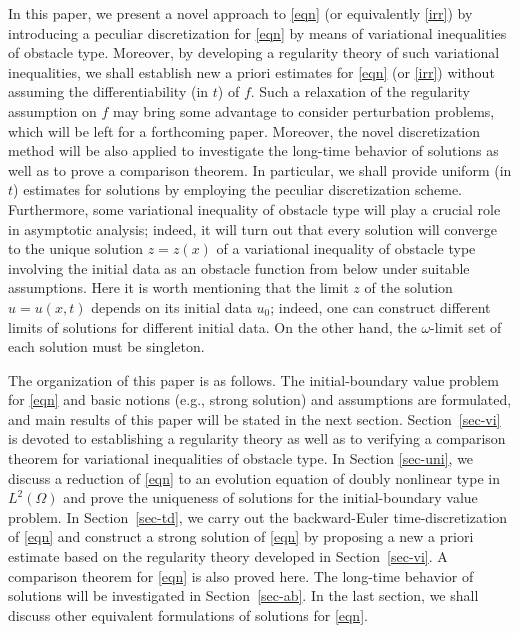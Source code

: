 \documentclass[reqno,10pt]{amsart}
\begin{document}
In this paper, we present a novel approach to \eqref{eqn} (or
equivalently \eqref{irr}) by introducing a peculiar discretization
for \eqref{eqn} by means of variational inequalities of
obstacle type. Moreover, by developing a regularity theory of such variational
inequalities, we shall establish new a priori estimates
for \eqref{eqn} (or \eqref{irr}) without assuming the differentiability
(in $t$) of $f$. Such a relaxation of the regularity assumption on $f$
may bring some advantage to consider perturbation problems, which will be left
for a forthcoming paper. Moreover, the novel discretization method will
be also applied to investigate the long-time behavior of solutions as well as
to prove a comparison theorem. In particular, we shall provide uniform
(in $t$) estimates for solutions by employing the peculiar discretization
scheme. Furthermore, some variational inequality of obstacle type will play
a crucial role in asymptotic analysis; indeed, it will turn out that
every solution will converge to the unique solution ${z} = {z}(x)$ of
a variational inequality of obstacle type involving the initial data as
an obstacle function from below under suitable assumptions. Here it is
worth mentioning that the limit ${z}$ of the solution $u = u(x,t)$
depends on its initial data $u_0$; indeed, one can construct different
limits of solutions for different initial data. On the other hand, the
$\omega$-limit set of each solution must be singleton. 

The organization of this paper is as follows. 
The initial-boundary value problem for \eqref{eqn} and basic notions
(e.g., strong solution) and assumptions are formulated, and main results
of this paper will be stated in the next section. 
Section~\ref{sec-vi} is devoted to establishing a regularity theory as
well as to verifying a comparison theorem for variational inequalities of obstacle
type. In Section \ref{sec-uni}, we discuss a reduction of \eqref{eqn} to
an evolution equation of doubly nonlinear type in $L^2(\Omega)$ and
prove the uniqueness of solutions for the initial-boundary value problem.
In Section~\ref{sec-td}, we carry out the backward-Euler
time-discretization of \eqref{eqn} and construct a strong solution of
\eqref{eqn} by proposing a new a priori estimate based on the regularity
theory developed in Section~\ref{sec-vi}. A comparison theorem for
\eqref{eqn} is also proved here. The long-time behavior of solutions
will be investigated in Section~\ref{sec-ab}. In the last section, we
shall discuss other equivalent formulations of solutions for \eqref{eqn}.
\end{document}
